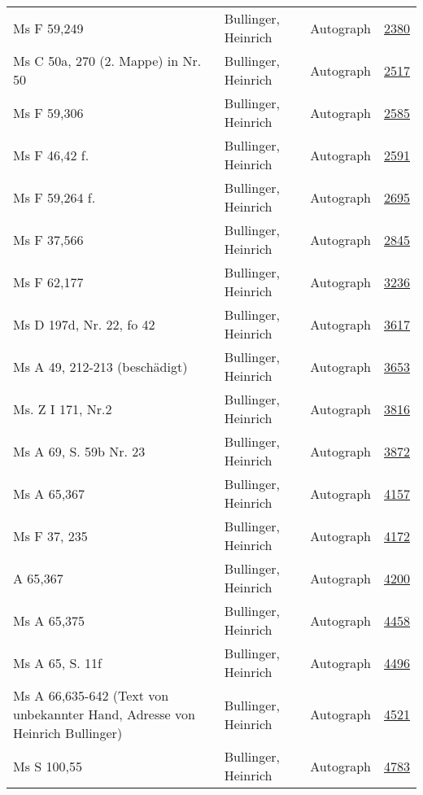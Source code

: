 \documentclass[10pt,a4paper,landscape]{report}
\begin{document}
\begin{longtable}{p{16cm}p{4cm}lr}
Ms F 59,249	&	Bullinger, Heinrich	&	Autograph	&	\href{http://130.60.24.72/assignment/2380}{2380}\\
Ms C 50a, 270 (2. Mappe) in Nr. 50	&	Bullinger, Heinrich	&	Autograph	&	\href{http://130.60.24.72/assignment/2517}{2517}\\
Ms F 59,306	&	Bullinger, Heinrich	&	Autograph	&	\href{http://130.60.24.72/assignment/2585}{2585}\\
Ms F 46,42 f.	&	Bullinger, Heinrich	&	Autograph	&	\href{http://130.60.24.72/assignment/2591}{2591}\\
Ms F 59,264 f.	&	Bullinger, Heinrich	&	Autograph	&	\href{http://130.60.24.72/assignment/2695}{2695}\\
Ms F 37,566	&	Bullinger, Heinrich	&	Autograph	&	\href{http://130.60.24.72/assignment/2845}{2845}\\
Ms F 62,177	&	Bullinger, Heinrich	&	Autograph	&	\href{http://130.60.24.72/assignment/3236}{3236}\\
Ms D 197d, Nr. 22, fo 42	&	Bullinger, Heinrich	&	Autograph	&	\href{http://130.60.24.72/assignment/3617}{3617}\\
Ms A 49, 212-213 (beschädigt)	&	Bullinger, Heinrich	&	Autograph	&	\href{http://130.60.24.72/assignment/3653}{3653}\\
Ms. Z I 171, Nr.2	&	Bullinger, Heinrich	&	Autograph	&	\href{http://130.60.24.72/assignment/3816}{3816}\\
Ms A 69, S. 59b Nr. 23	&	Bullinger, Heinrich	&	Autograph	&	\href{http://130.60.24.72/assignment/3872}{3872}\\
Ms A 65,367	&	Bullinger, Heinrich	&	Autograph	&	\href{http://130.60.24.72/assignment/4157}{4157}\\
Ms F 37, 235	&	Bullinger, Heinrich	&	Autograph	&	\href{http://130.60.24.72/assignment/4172}{4172}\\
A 65,367	&	Bullinger, Heinrich	&	Autograph	&	\href{http://130.60.24.72/assignment/4200}{4200}\\
Ms A 65,375	&	Bullinger, Heinrich	&	Autograph	&	\href{http://130.60.24.72/assignment/4458}{4458}\\
Ms A 65, S. 11f	&	Bullinger, Heinrich	&	Autograph	&	\href{http://130.60.24.72/assignment/4496}{4496}\\
Ms A 66,635-642 (Text von unbekannter Hand, Adresse von Heinrich Bullinger)	&	Bullinger, Heinrich	&	Autograph	&	\href{http://130.60.24.72/assignment/4521}{4521}\\
Ms S 100,55	&	Bullinger, Heinrich	&	Autograph	&	\href{http://130.60.24.72/assignment/4783}{4783}\\

\end{longtable}
\end{document}
